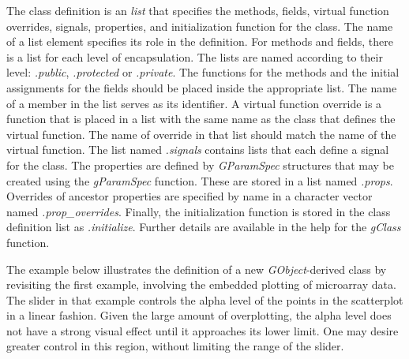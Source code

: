 \documentclass[article]{jss}
\begin{document}
The class definition is an  \emph{list} that specifies the
methods, fields, virtual function overrides, signals, properties, and
initialization function for the class. The name of a list element specifies
its role in the definition. For methods and fields, there is a 
list for each level of encapsulation. The lists are named
according to their level: \emph{.public}, \emph{.protected} or \emph{.private}. 
The functions for the methods and the initial assignments for the fields should
be placed inside the appropriate list. The name of a member in the list 
serves as its identifier. A virtual function override is a function that is 
placed in a list with the same name as the class that defines the virtual 
function. The name of override in that list should match the name of the virtual 
function. The list named \emph{.signals} contains lists that each define
a signal for the class. The properties are defined by \emph{GParamSpec}
structures that may be created using the \emph{gParamSpec} function. These
are stored in a list named \emph{.props}. Overrides of ancestor properties
are specified by name in a character vector named \emph{.prop\_overrides}.
Finally, the initialization function
is stored in the class definition list as \emph{.initialize}. Further details
are available in the  help for the \emph{gClass} function.

The example below illustrates the definition of a new \emph{GObject}-derived
class by revisiting the first example, involving the embedded plotting of 
microarray data. The slider in that example controls the alpha level of the
points in the scatterplot in a linear fashion. Given the large amount of
overplotting, the alpha level does not have a strong visual effect until it
approaches its lower limit. One may desire greater control in this region,
without limiting the range of the slider. 
\end{document}
